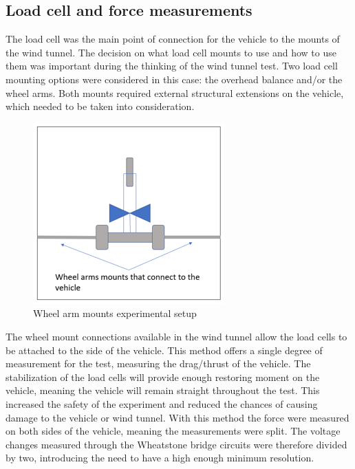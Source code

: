 \subsection{Load cell and force measurements}

The load cell was the main point of connection for the vehicle to the mounts of the wind tunnel. The decision on what load cell mounts to use and how to use them was important during the thinking of the wind tunnel test. Two load cell mounting options were considered in this case: the overhead balance and/or the wheel arms. Both mounts required external structural extensions on the vehicle, which needed to be taken into consideration.

\begin{figure}[!htbp]
    \centering
    \includegraphics{images/part10/wheelmounts.png}
    \caption{Wheel arm mounts experimental setup}
    \label{fig:wheelmounts}
\end{figure}

The wheel mount connections available in the wind tunnel allow the load cells to be attached to the side of the vehicle. This method offers a single degree of measurement for the test, measuring the drag/thrust of the vehicle. The stabilization of the load cells will provide enough restoring moment on the vehicle, meaning the vehicle will remain 
straight throughout the test. This increased the safety of the experiment and reduced the chances of causing damage to the vehicle or wind tunnel. With this method the force were measured on both sides of the vehicle, meaning the measurements were split. The voltage changes measured through the Wheatstone bridge circuits were therefore divided by two, introducing the need to have a high enough minimum resolution.


